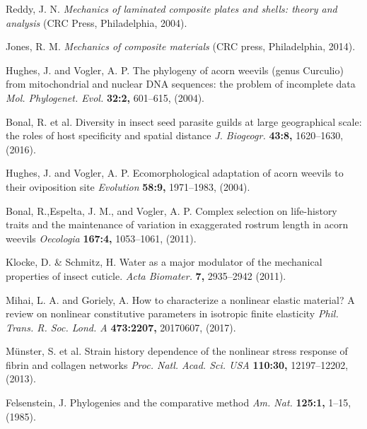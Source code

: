 \documentclass[twocolumn, linenumbers, superscriptaddress, nofootinbib]{revtex4-1}
\begin{document}
\begin{thebibliography}{50}
				Reddy, J. N.
				\textit{Mechanics of laminated composite plates and shells: theory and analysis}
				(CRC Press,
				Philadelphia,
				2004).
			
				Jones, R. M.
				\textit{Mechanics of composite materials}
				(CRC press,
				Philadelphia,
				2014).
			
				Hughes, J. and Vogler, A. P.
				The phylogeny of acorn weevils (genus Curculio) from mitochondrial and nuclear DNA sequences: the problem of incomplete data
				\textit{Mol. Phylogenet. Evol.}
				\textbf{32:2,}
				601--615,
				(2004).
				
				Bonal, R. et al.
				Diversity in insect seed parasite guilds at large geographical scale: the roles of host specificity and spatial distance
				\textit{J. Biogeogr.}
				\textbf{43:8,}
				1620--1630,
				(2016).
				
				Hughes, J. and Vogler, A. P.
				Ecomorphological adaptation of acorn weevils to their oviposition site
				\textit{Evolution}
				\textbf{58:9,}
				1971--1983,
				(2004).	
				
				Bonal, R.,Espelta, J. M., and Vogler, A. P.
				Complex selection on life-history traits and the maintenance of variation in exaggerated rostrum length in acorn weevils
				\textit{Oecologia}
				\textbf{167:4,}
				1053--1061,
				(2011).
			
				Klocke, D. \& Schmitz, H.
				Water as a major modulator of the mechanical properties of insect cuticle.
				\textit{Acta Biomater.}
				\textbf{7,}
				2935--2942
				(2011).
				
				Mihai, L. A. and Goriely, A.
				How to characterize a nonlinear elastic material? A review on nonlinear constitutive parameters in isotropic finite elasticity
				\textit{Phil. Trans. R. Soc. Lond. A}
				\textbf{473:2207,}
				20170607,
				(2017).
			
				M{\"u}nster, S. et al.
				Strain history dependence of the nonlinear stress response of fibrin and collagen networks
				\textit{Proc. Natl. Acad. Sci. USA}
				\textbf{110:30,}
				12197--12202,
				(2013).
			
				Felsenstein, J.
				Phylogenies and the comparative method
				\textit{Am. Nat.}
				\textbf{125:1,}
				1--15,
				(1985).
			

\end{thebibliography}
\end{document}
